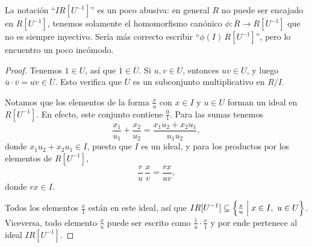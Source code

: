 La notación ``$I R [U^{-1}]$'' es un poco abusiva: en general $R$ no puede ser
encajado en $R [U^{-1}]$, tenemos solamente el homomorfismo canónico
$\phi\colon R\to R [U^{-1}]$ que no es siempre inyectivo. Sería más correcto
escribir ``$\phi (I)\,R [U^{-1}]$'', pero lo encuentro un poco incómodo.

\begin{proof}
  Tenemos $1 \in U$, así que $\overline{1} \in \overline{U}$. Si $u,v\in U$,
  entonces $uv\in U$, y luego
  $\overline{u}\cdot \overline{v} = \overline{uv} \in \overline{U}$. Esto
  verifica que $\overline{U}$ es un subconjunto multiplicativo en $R/I$.

  Notamos que los elementos de la forma $\frac{x}{u}$ con $x\in I$ y $u \in U$
  forman un ideal en $R [U^{-1}]$. En efecto, este conjunto contiene
  $\frac{0}{1}$. Para las sumas tenemos
  $$\frac{x_1}{u_1} + \frac{x_2}{u_2} = \frac{x_1 u_2 + x_2 u_1}{u_1 u_2},$$
  donde $x_1 u_2 + x_2 u_1 \in I$, puesto que $I$ es un ideal, y para los
  productos por los elementos de $R [U^{-1}]$,
  $$\frac{r}{u}\,\frac{x}{v} = \frac{rx}{uv},$$
  donde $rx \in I$.

  Todos los elementos $\frac{x}{1}$ están en este ideal, así que
  $I R [U^{-1}] \subseteq \Bigl\{ \frac{x}{u} \Bigm| x\in I, ~ u\in U
  \Bigr\}$. Viceversa, todo elemento $\frac{x}{u}$ puede ser escrito como
  $\frac{1}{u}\cdot \frac{x}{1}$ y por ende pertenece al ideal $I R [U^{-1}]$.


\end{proof}
